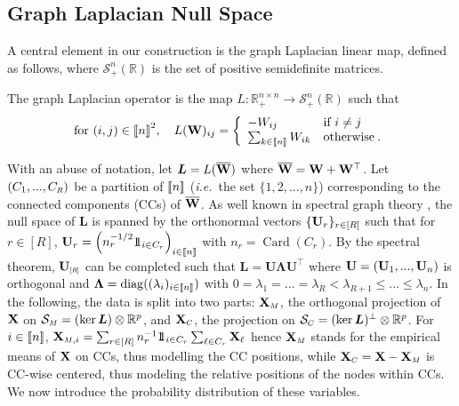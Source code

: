 \subsection{Graph Laplacian Null Space}\label{sec:laplacian_prop}
A central element in our construction is the graph Laplacian linear map, defined as follows, where $\mathcal{S}^n_+(\mathbb{R})$ is the set of positive semidefinite matrices.
\begin{definition}\label{graph_laplacian}
The graph Laplacian operator is the map $L \colon \mathbb{R}_+^{n \times n} \to \mathcal{S}^n_+(\mathbb{R})$ such that
$$\text{for } (i,j) \in {[\![n]\!]}^2, \quad L(\mathbf{W})_{ij} = \left\{
\begin{array}{ll}
    - W_{ij} & \text{if } i \neq j \\
    \sum_{k \in {[\![n]\!]}} W_{ik} & \text{otherwise} \:.
\end{array} 
\right. $$
\end{definition}
With an abuse of notation, let $\bm{L} = L(\overline{\mathbf{W}})$ where $\overline{\mathbf{W}} = \mathbf{W} + \mathbf{W}^\top$. Let $(C_1,...,C_{\scaleto{R}{4pt}})$ be a partition of ${[\![n]\!]}$ (\textit{i.e.}\ the set $\{1,2,...,n\}$) corresponding to the connected components (CCs) of $\overline{\mathbf{W}}$. As well known in spectral graph theory \cite{Chung97}, the null space of $\bm{L}$ is spanned by the orthonormal vectors $\{\mathbf{U}_{r}\}_{r \in [R]}$ such that for $r \in [R]$,
$\mathbf{U}_{r} = \left(n_r^{-1/2} 1\!\!1_{i \in C_r}\right)_{i \in {[\![n]\!]}}$ with $n_r = \operatorname{Card}(C_r)$. By the spectral theorem, $\Ub_{\scaleto{[R]}{5pt}}$ can be completed such that $\bm{L} = \bm{U \Lambda U^\top}$ where $\mathbf{U} = (\mathbf{U}_1, ..., \mathbf{U}_n)$ is orthogonal and $\bm{\Lambda} = \operatorname{diag}((\lambda_i)_{i \in {[\![n]\!]}})$ with $0 = \lambda_1 = ... = \lambda_R < \lambda_{R+1} \leq ... \leq \lambda_n$. In the following, the data is split into two parts: $\Xb_{\scaleto{M}{4pt}}$, the orthogonal projection of $\mathbf{X}$ on $\mathcal{S}_{\scaleto{M}{4pt}} = (\ker \bm{L}) \otimes \mathbb{R}^p$, and $\Xb_{\scaleto{C}{4pt}}$, the projection on $\mathcal{S}_{\scaleto{C}{4pt}} = (\ker \bm{L})^{\perp} \otimes \mathbb{R}^p$. For $i \in {[\![n]\!]}$, $\Xb_{\scaleto{M}{4pt},i} = \sum_{r \in [R]} n_r^{-1} \ind_{i \in C_r}\sum_{\ell \in C_r} \Xb_{\ell} $ hence $\Xb_{\scaleto{M}{4pt}}$ stands for the empirical means of $\mathbf{X}$ on CCs, thus modelling the CC positions, while $\Xb_{\scaleto{C}{4pt}} = \Xb - \Xb_{\scaleto{M}{4pt}}$ is CC-wise centered, thus modeling the relative positions of the nodes within CCs. We now introduce the probability distribution of these variables.

